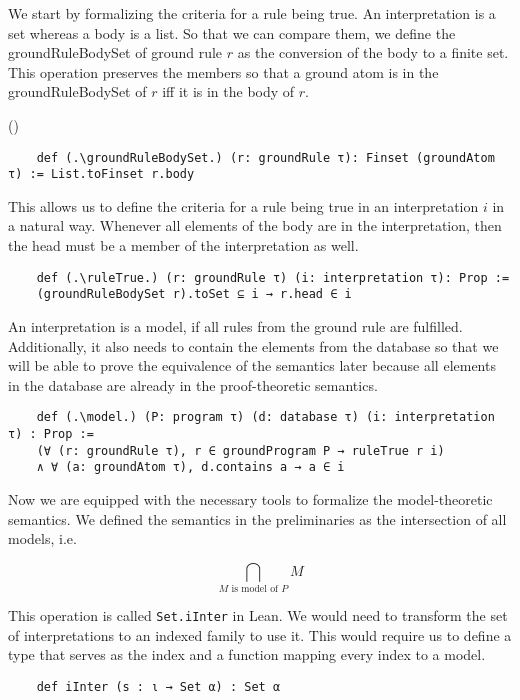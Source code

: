 We start by formalizing the criteria for a rule being true. An interpretation is a set whereas a body is a list. So that we can compare them, we define the groundRuleBodySet of ground rule $r$ as the conversion of the body to a finite set. This operation preserves the members so that a ground atom is in the groundRuleBodySet of $r$ iff it is in the body of $r$.


(\groundRuleBodySetiffgroundRuleBody)


\begin{lstlisting}
    def (.\groundRuleBodySet.) (r: groundRule τ): Finset (groundAtom τ) := List.toFinset r.body
\end{lstlisting}

This allows us to define the criteria for a rule being true in an interpretation $i$ in a natural way. Whenever all elements of the body are in the interpretation, then the head must be a member of the interpretation as well.

\begin{lstlisting}
    def (.\ruleTrue.) (r: groundRule τ) (i: interpretation τ): Prop := 
    (groundRuleBodySet r).toSet ⊆ i → r.head ∈ i
\end{lstlisting}

An interpretation is a model, if all rules from the ground rule are fulfilled. Additionally, it also needs to contain the elements from the database so that we will be able to prove the equivalence of the semantics later because all elements in the database are already in the proof-theoretic semantics.

\begin{lstlisting}
    def (.\model.) (P: program τ) (d: database τ) (i: interpretation τ) : Prop := 
    (∀ (r: groundRule τ), r ∈ groundProgram P → ruleTrue r i) 
    ∧ ∀ (a: groundAtom τ), d.contains a → a ∈ i
\end{lstlisting}

Now we are equipped with the necessary tools to formalize the model-theoretic semantics.  We defined the semantics in the preliminaries as the intersection of all models, i.e.

\[\bigcap_{\text{$M$ is model of $P$}} M\] 

This operation is called \lstinline|Set.iInter| in Lean. We would need to transform the set of interpretations to an indexed family to use it. This would require us to define a type that serves as the index and a function mapping every index to a model.

\begin{lstlisting}
    def iInter (s : ι → Set α) : Set α
\end{lstlisting}

